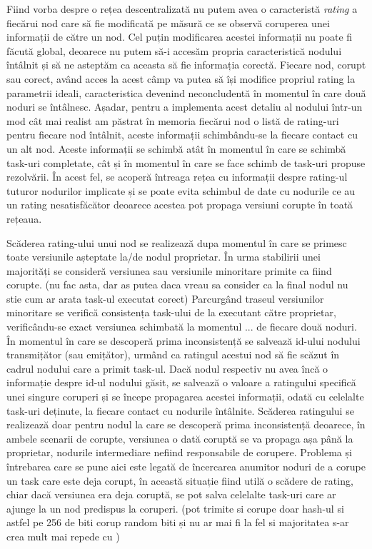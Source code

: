 \documentclass[12pt,a4paper]{report}
\begin{document}
Fiind vorba despre o rețea descentralizată nu putem avea o caracteristă \textit{rating} a fiecărui nod care să fie modificată pe măsură ce se observă coruperea unei informații de către un nod. Cel puțin modificarea acestei informații nu poate fi făcută global, deoarece nu putem să-i accesăm propria caracteristică nodului întâlnit și să ne asteptăm ca aceasta să fie informația corectă. Fiecare nod, corupt sau corect, având acces la acest câmp va putea să își modifice propriul rating la parametrii ideali, caracteristica devenind neconcludentă în momentul în care două noduri se întâlnesc. Așadar, pentru a implementa acest detaliu al nodului într-un mod cât mai realist am păstrat în memoria fiecărui nod o listă de rating-uri pentru fiecare nod întâlnit, aceste informații schimbându-se la fiecare contact cu un alt nod. Aceste informații se schimbă atât în momentul în care se schimbă task-uri completate, cât și în momentul în care se face schimb de task-uri propuse rezolvării. În acest fel, se acoperă întreaga rețea cu informații despre rating-ul tuturor nodurilor implicate și se poate evita schimbul de date cu nodurile ce au un rating nesatisfăcător deoarece acestea pot propaga versiuni corupte în toată rețeaua.

Scăderea rating-ului unui nod se realizează dupa momentul în care se primesc toate versiunile așteptate la/de nodul proprietar. În urma stabilirii unei majorități se consideră versiunea sau versiunile minoritare primite ca fiind corupte. (nu fac asta, dar as putea daca vreau sa consider ca la final nodul nu stie cum ar arata task-ul executat corect) Parcurgând traseul versiunilor minoritare se verifică consistența task-ului de la executant către proprietar, verificându-se exact versiunea schimbată la momentul ... de fiecare două noduri. În momentul în care se descoperă prima inconsistență se salvează id-ului nodului transmițător (sau emițător), urmând ca ratingul acestui nod să fie scăzut în cadrul nodului care a primit task-ul. Dacă nodul respectiv nu avea încă o informație despre id-ul nodului găsit, se salvează o valoare a ratingului specifică unei singure coruperi și se începe propagarea acestei informații, odată cu celelalte task-uri deținute, la fiecare contact cu nodurile întâlnite. Scăderea ratingului se realizează doar pentru nodul la care se descoperă prima inconsistență deoarece, în ambele scenarii de corupte, versiunea o dată coruptă se va propaga așa până la proprietar, nodurile intermediare nefiind responsabile de corupere. Problema și întrebarea care se pune aici este legată de încercarea anumitor noduri de a corupe un task care este deja corupt, în această situație fiind utilă o scădere de rating, chiar dacă versiunea era deja coruptă, se pot salva celelalte task-uri care ar ajunge la un nod predispus la coruperi.   (pot trimite si corupe doar hash-ul si astfel pe 256 de biti corup random biti și nu ar mai fi la fel si majoritatea s-ar crea mult mai repede cu )   
\end{document}
